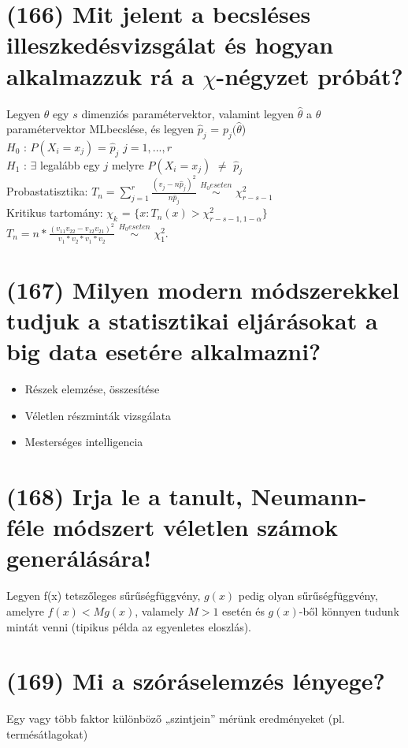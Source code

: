 \documentclass[12p]{article}
\begin{document}
\section{(166) Mit jelent a becsléses illeszkedésvizsgálat és hogyan alkalmazzuk rá a $\chi$-négyzet próbát?}

Legyen $\theta$ egy $s$ dimenziós paramétervektor, valamint legyen $\hat{\theta}$ a $\theta$ paramétervektor MLbecslése, és legyen $\hat{p}_j$ = $p_j (\hat{\theta}$)\\
$H_0$ : $P(X_i = x_j)$ = $\hat{p}_j$ $j = 1,. . . , r$\\
$H_1$ : $\exists$ legalább egy $j$ melyre $P(X_i = x_j)$ $\neq$ $\hat{p}_j$\\
Probastatisztika: $T_n = \displaystyle{\sum_{j=1}^{r}}\frac{(v_j - n\hat{p}_j)^2}{n\hat{p}_j}$ $\stackrel{H_0 eseten}{\sim}$ $\chi^2_{r-s-1}$\\
Kritikus tartomány: $\chi_k$ = $\{x: T_n(x) > \chi^2_{r-s-1,1-\alpha}\}$\\
$T_n = n * \frac{(v_{11}v_{22} - v_{12}v_{21})^2}{v_1 * v_2 * v_1 * v_2}$ $\stackrel{H_0 eseten}{\sim}$ $\chi^2_1$.



\section{(167) Milyen modern módszerekkel tudjuk a statisztikai eljárásokat a big data esetére alkalmazni?}

\begin{itemize}
\item Részek elemzése, összesítése
\item Véletlen részminták vizsgálata
\item Mesterséges intelligencia
\end{itemize}


\section{(168) Irja le a tanult, Neumann-féle módszert véletlen számok generálására!}
Legyen f(x) tetszőleges sűrűségfüggvény, $g(x)$ pedig olyan sűrűségfüggvény, amelyre $f(x) < Mg(x)$, valamely $M>1$ esetén és $g(x)$-ből könnyen tudunk mintát venni (tipikus példa az egyenletes eloszlás).

\section{(169) Mi a szóráselemzés lényege?}
Egy vagy több faktor különböző „szintjein” mérünk eredményeket (pl. termésátlagokat)
\end{document}
